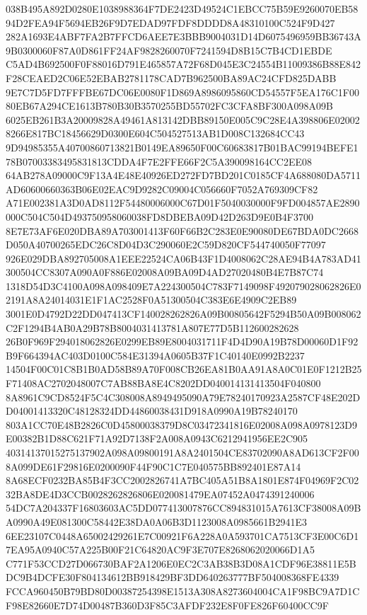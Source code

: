 \documentclass[UTF8,fontset=fandol,zihao=-4,a4paper]{ctexart}
\begin{document}
{{038B495A892D0280E1038988364F7DE2423D49524C1EBCC75B59E9260070EB5894D2FEA94F5694EB26F9D7EDAD97FDF8DDDD8A48310100C524F9D427
282A1693E4ABF7FA2B7FFCD6AEE7E3BBB9004031D14D6075496959BB36743A9B0300060F87A0D861FF24AF9828260070F7241594D8B15C7B4CD1EBDE
C5AD4B692500F0F88016D791E465857A72F68D045E3C24554B11009386B88E842F28CEAED2C06E52EBAB2781178CAD7B962500BA89AC24CFD825DABB
9E7C7D5FD7FFFBE67DC06E0080F1D869A8986095860CD54557F5EA176C1F0080EB67A294CE1613B780B30B3570255BD55702FC3CFA8BF300A098A09B
6025EB261B3A20009828A49461A813142DBB89150E005C9C28E4A398806E020028266E817BC18456629D0300E604C504527513AB1D008C132684CC43
9D94985355A40700860713821B0149EA89650F00C60683817B01BAC99194BEFE178B07003383495831813CDDA4F7E2FFE66F2C5A390098164CC2EE08
64AB278A09000C9F13A4E48E40926ED272FD7BD201C0185CF4A688080DA5711AD60600660363B06E02EAC9D9282C09004C056660F7052A769309CF82
A71E002381A3D0AD8112F54480006000C67D01F5040030000F9FD004857AE2890000C504C504D493750958060038FD8DBEBA09D42D263D9E0B4F3700
8E7E73AF6E020DBA89A703001413F60F66B2C283E0E90080DE67BDA0DC2668D050A40700265EDC26C8D04D3C290060E2C59D820CF544740050F77097
926E029DBA892705008A1EEE22524CA06B43F1D4008062C28AE94B4A783AD41300504CC8307A090A0F886E02008A09BA09D4AD27020480B4E7B87C74
1318D54D3C4100A098A098409E7A224300504C783F7149098F492079028062826E02191A8A24014031E1F1AC2528F0A51300504C383E6E4909C2EB89
3001E0D4792D22DD047413CF140028262826A09B00805642F5294B50A09B008062C2F1294B4AB0A29B78B8004031413781A807E77D5B112600282628
26B0F969F294018062826E0299EB89E8004031711F4D4D90A19B78D00060D1F92B9F664394AC403D0100C584E31394A0605B37F1C40140E0992B2237
14504F00C01C8B1B0AD58B89A70F008CB26EA81B0AA91A8A0C01E0F1212B25F71408AC2702048007C7AB88BA8E4C8202DD040014131413504F040800
8A8961C9CD8524F5C4C308008A8949495090A79E78240170923A2587CF48E202DD04001413320C48128324DD44860038431D918A0990A19B78240170
803A1CC70E48B2826C0D45800038379D8C03472341816E02008A098A0978123D9E00382B1D88C621F71A92D7138F2A008A0943C6212941956EE2C905
40314137015275137902A098A09800191A8A2401504CE83702090A8AD613CF2F008A099DE61F29816E0200090F44F90C1C7E040575BB892401E87A14
8A68ECF0232BA85B4F3CC2002826741A7BC405A51B8A1801E874F04969F2C0232BA8DE4D3CCB0028262826806E020081479EA07452A0474391240006
54DC7A204337F16803603AC5DD077413007876CC894831015A7613CF38008A09BA0990A49E081300C58442E38DA0A06B3D1123008A0985661B2941E3
6EE23107C0448A65002429261E7C00921F6A228A0A593701CA7513CF3E00C6D17EA95A0940C57A225B00F21C64820AC9F3E707E8268062020066D1A5
C771F53CCD27D066730BAF2A1206E0EC2C3AB38B3D08A1CDF96E38811E5BDC9B4DCFE30F804134612BB918429BF3DD640263777BF504008368FE4339
FCCA960450B79BD80D00387254398E1513A308A8273604004CA1F98BC9A7D1CF98E82660E7D74D00487B360D3F85C3AFDF232E8F0FE826F60400CC9F
}}
\end{document}

